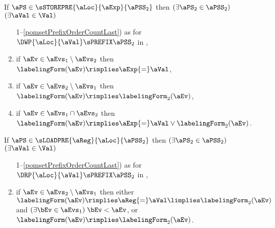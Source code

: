 \begin{definition}
  \noindent
  If $\aPS \in \sSTOREPRE{\aLoc}{\aExp}{\aPSS_2}$ then
  $(\exists\aPS_2\in\aPSS_2)$
  $(\exists\aVal\in\Val)$
  \begin{enumerate}[topsep=0pt]
    \setcounter{enumi}{\value{pomsetPrefixOrderCount}}
  \item[1--\ref{pomsetPrefixOrderCountLast})]
    as for $\DWP{\aLoc}{\aVal}\sPREFIX\aPSS_2$ in , %
  \item \label{storepre-kappa1}
    if $\aEv\in\aEvs_1\setminus\aEvs_2$ then $\labelingForm(\aEv) \rimplies \aExp{=}\aVal$,
  \item \label{storepre-kappa2}
    if $\aEv\in\aEvs_2\setminus\aEvs_1$ then $\labelingForm(\aEv) \rimplies \labelingForm_2(\aEv)$,
  \item \label{storepre-kappa12}
    if $\aEv\in\aEvs_1\cap\aEvs_2$ then $\labelingForm(\aEv) \rimplies \aExp{=}\aVal \lor \labelingForm_2(\aEv)$.
  \end{enumerate}

  \noindent
  If $\aPS \in \sLOADPRE{\aReg}{\aLoc}{\aPSS_2}$ then
  $(\exists\aPS_2\in\aPSS_2)$
  $(\exists\aVal\in\Val)$
  \begin{enumerate}[topsep=0pt]
    \setcounter{enumi}{\value{pomsetPrefixOrderCount}}
  \item[1--\ref{pomsetPrefixOrderCountLast})]
    as for $\DRP{\aLoc}{\aVal}\sPREFIX\aPSS_2$ in , %
  \item \label{loadpre-kappa2}
    if $\aEv\in\aEvs_2\setminus\aEvs_1$ then either \\
    $\labelingForm(\aEv) \rimplies \aReg{=}\aVal\limplies\labelingForm_2(\aEv)$ and $(\exists\bEv\in\aEvs_1)\;\bEv<\aEv$, or \\
    $\labelingForm(\aEv) \rimplies \labelingForm_2(\aEv)$.
  \end{enumerate}  


\end{definition}
